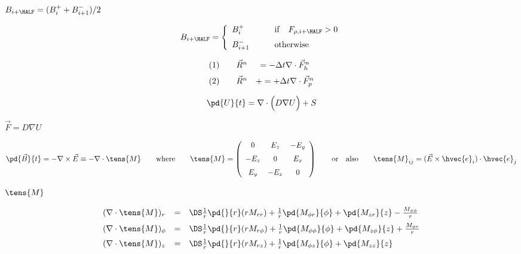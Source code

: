 \documentclass{article}
\begin{document}
$ B_{i+\HALF} = (B^+_i + B^-_{i+1})/2 $
\pagebreak

\[   B_{i+\HALF} = \left\{\begin{array}{ll}
    B^+_i      & \qquad{\rm if}\quad F_{\rho,i+\HALF} > 0\\ \noalign{\medskip}
    B^-_{i+1}  & \qquad{\rm otherwise}
    \end{array}\right.
\]
\pagebreak

\[  \begin{array}{llc}
    (1)\quad & \vec{R}^{n} &  =  - \Delta t\nabla\cdot\vec{F}_h^n
    \\ \noalign{\medskip}
    (2)\quad & \vec{R}^{n} & +=  + \Delta t\nabla\cdot\vec{F}_p^n
  \end{array}
\]
\pagebreak

\[  \pd{U}{t} = \nabla\cdot\Big(D\nabla U\Big) + S
\]
\pagebreak

$\vec{F} = D\nabla U$
\pagebreak

\[  \pd{\vec{B}}{t} = - \nabla\times\vec{E} \equiv -\nabla\cdot\tens{M}
  \qquad\mathrm{where}\qquad
  \tens{M} = \left(\begin{array}{ccc}
      0    &  E_z  & -E_y  \\ \noalign{\medskip}
     -E_z  &  0    &  E_x  \\ \noalign{\medskip}
      E_y  & -E_x  & 0
  \end{array}\right) \qquad\mathrm{or\quad also}\qquad
  \tens{M}_{ij} = (\vec{E}\times\hvec{e}_i)\cdot\hvec{e}_j
\]
\pagebreak

$\tens{M}$
\pagebreak

\[   \begin{array}{lcl}
   (\nabla\cdot\tens{M})_r &=&\DS
                                 \frac{1}{r}\pd{}{r}(rM_{rr})
                               + \frac{1}{r}\pd{M_{\phi r}}{\phi}
                               +            \pd{M_{zr}}{z}
                               - \frac{M_{\phi\phi}}{r}
   \\ \noalign{\medskip}
   (\nabla\cdot\tens{M})_\phi &=&\DS
                                 \frac{1}{r}\pd{}{r}(rM_{r\phi})
                               + \frac{1}{r}\pd{M_{\phi\phi}}{\phi}
                               +            \pd{M_{z\phi}}{z}
                               + \frac{M_{\phi r}}{r}
   \\ \noalign{\medskip}
   (\nabla\cdot\tens{M})_z &=&\DS
                                 \frac{1}{r}\pd{}{r}(rM_{rz})
                               + \frac{1}{r}\pd{M_{\phi z}}{\phi}
                               +            \pd{M_{zz}}{z}
   \end{array}
\]
\pagebreak
\end{document}
